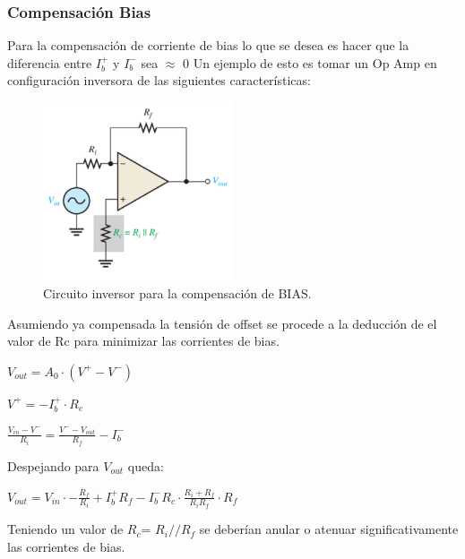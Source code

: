 \subsubsection{Compensación Bias}
Para la compensación de corriente de bias lo que se desea es hacer que la diferencia entre $I_b^+$ y $I_b^-$ sea $\approx$ 0
Un ejemplo de esto es tomar un Op Amp en configuración inversora  de las siguientes características:
\begin{figure}[H]	
	\centering
	\includegraphics[width=0.5\textwidth]{imagenes/CompensacionBias.PNG}
	\caption{Circuito inversor para la compensación de BIAS.}
	\label{fig:CompensacionBias}
\end{figure}
Asumiendo ya compensada la tensión de offset se procede a la deducción de el valor de Rc para minimizar las corrientes de bias.
\begin{center}$V_{out}=A_0 \cdot (V^+ - V^-)$\\\end{center}
\begin{center}$V^+=-I_b^+ \cdot R_c$\\\end{center}
\begin{center}$\frac{V_{in}-V^-}{R_i}=\frac{V^- - V_{out}}{R_f} -I_b^-$\\\end{center}
Despejando para $V_{out}$ queda:
\begin{center}$V_{out}=V_{in}\cdot -\frac{R_f}{R_i}+I_b^+ R_f-I_b^- R_c \cdot \frac{R_i+R_f}{R_i R_f}\cdot R_f $\\\end{center}
Teniendo un valor de $R_c$= $R_i//R_f$ se deberían anular o atenuar significativamente las corrientes de bias.
